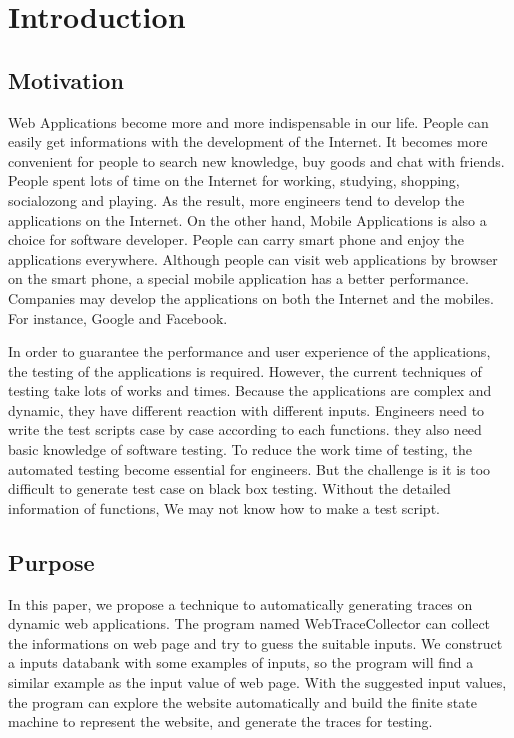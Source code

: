 
\chapter{Introduction}\label{ch:introduction}

\section{Motivation}

Web Applications become more and more indispensable in our life.
People can easily get informations with the development of the Internet.
It becomes more convenient for people to search new knowledge, buy goods and chat with friends.
People spent lots of time on the Internet for working, studying, shopping, socialozong and playing.
As the result, more engineers tend to develop the applications on the Internet.
On the other hand, Mobile Applications is also a choice for software developer.
People can carry smart phone and enjoy the applications everywhere.
Although people can visit web applications by browser on the smart phone,
a special mobile application has a better performance.
Companies may develop the applications on both the Internet and the mobiles.
For instance, Google and Facebook.

In order to guarantee the performance and user experience of the applications,
the testing of the applications is required.
However, the current techniques of testing take lots of works and times.
Because the applications are complex and dynamic,
they have different reaction with different inputs.
Engineers need to write the test scripts case by case according to each functions.
they also need basic knowledge of software testing.
To reduce the work time of testing, the automated testing become essential for engineers.
But the challenge is it is too difficult to generate test case on black box testing.
Without the detailed information of functions,
We may not know how to make a test script.



\section{Purpose}

In this paper, we propose a technique to automatically generating traces on dynamic web applications.
The program named WebTraceCollector can collect the informations on web page and try to guess the suitable inputs.
We construct a inputs databank with some examples of inputs,
so the program will find a similar example as the input value of web page.
With the suggested input values,
the program can explore the website automatically and build the finite state machine to represent the website,
and generate the traces for testing.


